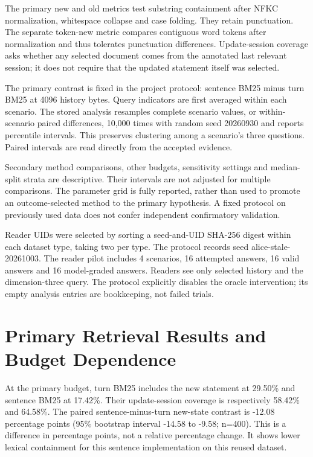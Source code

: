 \documentclass{article}
\begin{document}
The primary new and old metrics test substring containment after NFKC normalization, whitespace collapse and case folding. They retain punctuation. The separate token-new metric compares contiguous word tokens after normalization and thus tolerates punctuation differences. Update-session coverage asks whether any selected document comes from the annotated last relevant session; it does not require that the updated statement itself was selected.

The primary contrast is fixed in the project protocol: sentence BM25 minus turn BM25 at 4096 history bytes. Query indicators are first averaged within each scenario. The stored analysis resamples complete scenario values, or within-scenario paired differences, 10,000 times with random seed 20260930 and reports percentile intervals. This preserves clustering among a scenario's three questions. Paired intervals are read directly from the accepted evidence.

Secondary method comparisons, other budgets, sensitivity settings and median-split strata are descriptive. Their intervals are not adjusted for multiple comparisons. The parameter grid is fully reported, rather than used to promote an outcome-selected method to the primary hypothesis. A fixed protocol on previously used data does not confer independent confirmatory validation.

Reader UIDs were selected by sorting a seed-and-UID SHA-256 digest within each dataset type, taking two per type. The protocol records seed alice-stale-20261003. The reader pilot includes 4 scenarios, 16 attempted answers, 16 valid answers and 16 model-graded answers. Readers see only selected history and the dimension-three query. The protocol explicitly disables the oracle intervention; its empty analysis entries are bookkeeping, not failed trials.

\section{Primary Retrieval Results and Budget Dependence}
At the primary budget, turn BM25 includes the new statement at 29.50\% and sentence BM25 at 17.42\%. Their update-session coverage is respectively 58.42\% and 64.58\%. The paired sentence-minus-turn new-state contrast is -12.08 percentage points (95\% bootstrap interval -14.58 to -9.58; n=400). This is a difference in percentage points, not a relative percentage change. It shows lower lexical containment for this sentence implementation on this reused dataset.
\end{document}
